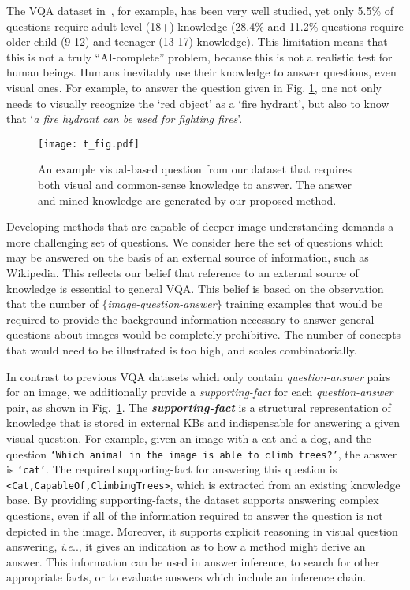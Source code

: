 \documentclass[10pt,journal]{IEEEtran}
\makeatletter
\DeclareRobustCommand\onedot{\futurelet\@let@token\@onedot}
\def\@onedot{\ifx\@let@token.\else.\null\fi\xspace}
\def\ie{\emph{i.e}\onedot} \def\Ie{\emph{I.e}\onedot}
\def\bluetext{}
\makeatother
\begin{document}
\bluetext{
The VQA dataset in~\cite{antol2015vqa}, for example, has been very well studied, yet only 5.5\% of questions require adult-level (18+) knowledge (28.4\% and 11.2\% questions require older child (9-12) and teenager (13-17) knowledge). }
This limitation means that this is not a truly ``AI-complete'' problem, because this is not a realistic test for human beings. Humans inevitably use their knowledge to answer questions, even visual ones.
For example, to answer the question given in  Fig. \ref{fig:t_figure}, one not only needs to visually recognize the `red object' as a `fire hydrant', but also to know that `{\em a fire hydrant can be used for fighting fires}'.

\begin{figure}[t!]
\begin{center}
	\texttt{[image: t\_fig.pdf]}
\end{center}
\vspace{-4pt}
\caption{An example visual-based question from our \KBName dataset that requires both visual and common-sense knowledge to answer. The answer and mined knowledge are generated by our proposed method.}
\label{fig:t_figure}
\vspace{-5pt}
\end{figure}

Developing methods that are capable of deeper image understanding demands a more challenging set of questions.
We consider here the set of questions which may be answered on the basis of an external source of information, such as Wikipedia.
This reflects our belief that reference to an external source of knowledge is essential to general VQA.  This belief is based on the observation that the number of $\{$\textit{image-question-answer}$\}$ training examples that would be required to provide the background information necessary to answer general questions about images would be completely prohibitive.
The number of concepts that would need to be illustrated is too high, and scales combinatorially.

In contrast to previous VQA datasets which only contain \textit{question-answer} pairs for an image, we additionally provide a \textit{supporting-fact} for each \textit{question-answer} pair, as shown in Fig.~\ref{fig:t_figure}. The \textit{\bf supporting-fact} is a structural representation of knowledge that is stored in external KBs and indispensable for answering a given visual question.
For example, given an image with a cat and a dog, and the question  \texttt{`Which animal in the image is able to climb trees?'},  the answer is \texttt{`cat'}. The required supporting-fact for answering this question is \texttt{<Cat,CapableOf,ClimbingTrees>}, which is extracted from an existing knowledge base. By providing supporting-facts, the dataset supports answering complex questions, even if all of the information required to answer the question is not depicted in the image. Moreover, it supports explicit reasoning in visual question answering, \ie, it gives an indication  as to how a method might derive an answer. This information can be used in answer inference, to search for other appropriate facts, or to evaluate answers which include an inference chain.
\end{document}
